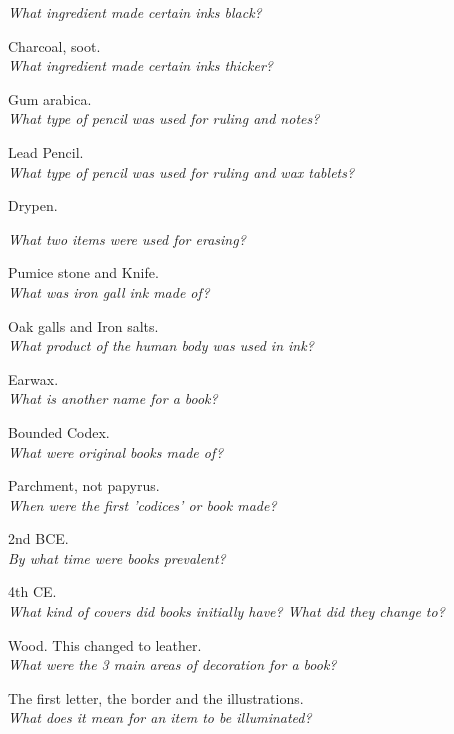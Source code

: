 \documentclass[12pt]{article}
\begin{document}
\textit{What ingredient made certain inks black?}

Charcoal, soot.\\

\textit{What ingredient made certain inks thicker?}

Gum arabica.\\

\textit{What type of pencil was used for ruling and notes?}

Lead Pencil.\\

\textit{What type of pencil was used for ruling and wax tablets?}

Drypen.

\textit{What two items were used for erasing?}

Pumice stone and Knife.\\

\textit{What was iron gall ink made of?}

Oak galls and Iron salts.\\

\textit{What product of the human body was used in ink?}

Earwax.\\

\textit{What is another name for a book?}

Bounded Codex.\\

\textit{What were original books made of?}

Parchment, not papyrus.\\

\textit{When were the first 'codices' or book made?}

2nd BCE.\\

\textit{By what time were books prevalent?}

4th CE.\\

\textit{What kind of covers did books initially have? What did they change to?}

Wood. This changed to leather.\\

\textit{What were the 3 main areas of decoration for a book?}

The first letter, the border and the illustrations.\\

\textit{What does it mean for an item to be illuminated?}
\end{document}
